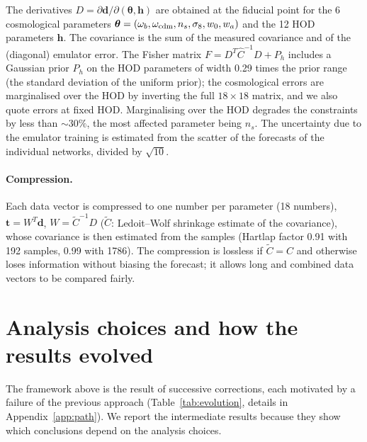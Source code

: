 \documentclass[11pt,twocolumn]{article}
\begin{document}
The derivatives $D=\partial\boldsymbol d/\partial(\boldsymbol\theta,\boldsymbol h)$ are obtained at the fiducial point for the 6 cosmological parameters $\boldsymbol\theta=(\omega_b,\omega_{\rm cdm},n_s,\sigma_8,w_0,w_a)$ and the 12 HOD parameters $\boldsymbol h$. The covariance is the sum of the measured covariance and of the (diagonal) emulator error. The Fisher matrix $F = D^T\hat C^{-1}D + P_h$ includes a Gaussian prior $P_h$ on the HOD parameters of width 0.29 times the prior range (the standard deviation of the uniform prior); the cosmological errors are marginalised over the HOD by inverting the full $18\times18$ matrix, and we also quote errors at fixed HOD. Marginalising over the HOD degrades the constraints by less than $\sim30\%$, the most affected parameter being $n_s$. The uncertainty due to the emulator training is estimated from the scatter of the forecasts of the individual networks, divided by $\sqrt{10}$.

\paragraph{Compression.} Each data vector is compressed to one number per parameter (18 numbers), $\boldsymbol t=W^T\boldsymbol d$, $W=\tilde C^{-1}D$ ($\tilde C$: Ledoit--Wolf shrinkage estimate of the covariance), whose covariance is then estimated from the samples (Hartlap factor 0.91 with 192 samples, 0.99 with 1786). The compression is lossless if $\tilde C=C$ and otherwise loses information without biasing the forecast; it allows long and combined data vectors to be compared fairly.

\section{Analysis choices and how the results evolved}
\label{sec:choices}

The framework above is the result of successive corrections, each motivated by a failure of the previous approach (Table~\ref{tab:evolution}, details in Appendix~\ref{app:path}). We report the intermediate results because they show which conclusions depend on the analysis choices.
\end{document}

